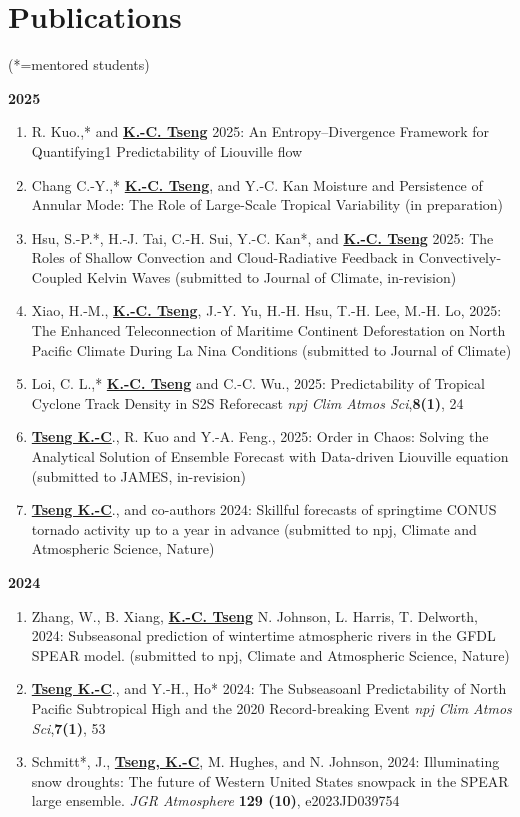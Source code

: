 \documentclass{article}
\begin{document}
\section{\color{airforceblue}Publications} (*=mentored students)\par
\normalsize{\bf{2025}} 
\begin{enumerate} 
	\item R. Kuo.,* and \normalsize{\bf{\underline{K.-C. Tseng}}} 2025: An Entropy–Divergence Framework for Quantifying1
Predictability of Liouville flow
	\item Chang C.-Y.,* \normalsize{\bf{\underline{K.-C. Tseng}}}, and Y.-C. Kan Moisture and Persistence of Annular Mode: The Role of Large-Scale Tropical Variability (in preparation) 
	\item Hsu, S.-P.*, H.-J. Tai, C.-H. Sui, Y.-C. Kan*, and \normalsize{\bf{\underline{K.-C. Tseng}}} 2025: The Roles of Shallow Convection and Cloud-Radiative Feedback in Convectively-Coupled Kelvin Waves (submitted to Journal of Climate, in-revision)
	\item Xiao, H.-M., \normalsize{\bf{\underline{K.-C. Tseng}}}, J.-Y. Yu, H.-H. Hsu, T.-H. Lee, M.-H. Lo, 2025: The Enhanced Teleconnection of Maritime Continent Deforestation on North Pacific Climate During La Nina Conditions (submitted to Journal of Climate)
	\item Loi, C. L.,* \normalsize{\bf{\underline{K.-C. Tseng}}} and C.-C. Wu., 2025: Predictability of Tropical Cyclone Track Density in S2S Reforecast  \textit{npj Clim Atmos Sci},\normalsize{\bf{8(1)}}, 24
	\item \normalsize{\bf{\underline{Tseng K.-C}}}., R. Kuo and Y.-A. Feng., 2025: Order in Chaos: Solving the Analytical Solution of Ensemble Forecast with Data-driven Liouville equation (submitted to JAMES, in-revision)
	\item \normalsize{\bf{\underline{Tseng K.-C}}}., and co-authors 2024: Skillful forecasts of springtime CONUS tornado activity up to a year in advance (submitted to npj, Climate and Atmospheric Science, Nature) 

\end{enumerate}	
\normalsize{\bf{2024}} 
\begin{enumerate}[resume]  
	\item Zhang, W., B. Xiang, \normalsize{\bf{\underline{K.-C. Tseng}}} N. Johnson, L. Harris, T. Delworth, 2024: Subseasonal prediction of wintertime atmospheric rivers in the GFDL SPEAR model. (submitted to npj, Climate and Atmospheric Science, Nature)
	\item \normalsize{\bf{\underline{Tseng K.-C}}}., and Y.-H., Ho* 2024: The Subseasoanl Predictability of North Pacific Subtropical High and the 2020 Record-breaking Event \textit{npj Clim Atmos Sci},\normalsize{\bf{7(1)}}, 53
	\item Schmitt*, J., \normalsize{\bf{\underline{Tseng, K.-C}}}, M. Hughes, and N. Johnson, 2024: Illuminating snow droughts: The future of Western United States snowpack in the SPEAR large ensemble. \textit{JGR Atmosphere} \normalsize{\bf{129 (10)}}, e2023JD039754
\end{enumerate}	
\end{document}
